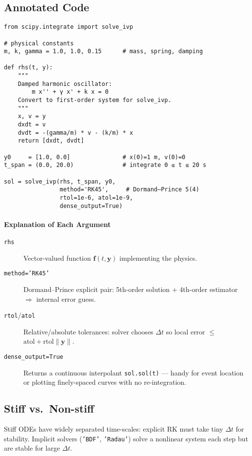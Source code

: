 \documentclass[a4paper,11pt]{article}
\begin{document}
\subsection{Annotated Code}

\begin{lstlisting}
from scipy.integrate import solve_ivp

# physical constants
m, k, gamma = 1.0, 1.0, 0.15      # mass, spring, damping

def rhs(t, y):
    """
    Damped harmonic oscillator:
        m x'' + γ x' + k x = 0
    Convert to first-order system for solve_ivp.
    """
    x, v = y
    dxdt = v
    dvdt = -(gamma/m) * v - (k/m) * x
    return [dxdt, dvdt]

y0     = [1.0, 0.0]               # x(0)=1 m, v(0)=0
t_span = (0.0, 20.0)              # integrate 0 ≤ t ≤ 20 s

sol = solve_ivp(rhs, t_span, y0,
                method='RK45',     # Dormand–Prince 5(4)
                rtol=1e-6, atol=1e-9,
                dense_output=True)
\end{lstlisting}

\paragraph{Explanation of Each Argument}
\begin{description}
  \item[\texttt{rhs}] Vector-valued function $\mathbf f(t,\mathbf y)$ implementing the physics.
  \item[\texttt{method='RK45'}] Dormand–Prince explicit pair: 5th-order solution + 4th-order estimator $\Rightarrow$ internal error guess.
  \item[\texttt{rtol}/\texttt{atol}] Relative/absolute tolerances: solver chooses $\Delta t$ so local error $\le$ \(\text{atol}+\text{rtol}\lVert\mathbf y\rVert\).
  \item[\texttt{dense\_output=True}] Returns a continuous interpolant \lstinline|sol.sol(t)| — handy for event location or plotting finely-spaced curves with no re-integration.
\end{description}

\subsection{Stiff vs.\ Non-stiff}
Stiff ODEs have widely separated time-scales: explicit RK must take tiny $\Delta t$ for stability.  
Implicit solvers (\texttt{'BDF'}, \texttt{'Radau'}) solve a nonlinear system each step but are stable for large $\Delta t$.
\end{document}
